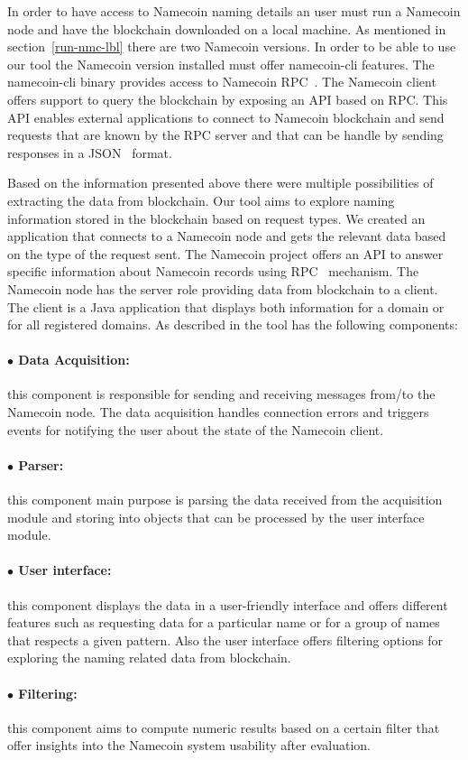 In order to have access to Namecoin naming details an user must run a Namecoin node and have the blockchain downloaded on a local machine.
As mentioned in section~\ref{run-nmc-lbl} there are two Namecoin versions. In order to be able to use our tool the Namecoin version installed must offer namecoin-cli features. The namecoin-cli binary provides access to Namecoin RPC~\cite{rfc1057}. The Namecoin client offers support to query the blockchain by exposing an API based on RPC. This API enables external applications to connect to Namecoin blockchain and send requests that are known by the RPC server and that can be handle by sending responses in a JSON~\cite{rfc7159} format.

Based on the information presented above there were multiple possibilities of extracting the data from blockchain.
Our tool aims to explore naming information stored in the blockchain based on request types.
We created an application that connects to a Namecoin node and gets the relevant data based on the type of the request sent. The Namecoin project offers an API to answer specific information about Namecoin records using RPC~\cite{rfc5531} mechanism.
The Namecoin node has the server role providing data from blockchain to a client. The client is a Java application that displays both information for a  domain or for all  registered domains. As described in  the tool has the following components:
\paragraph{$\bullet$ Data Acquisition:} this component is responsible for sending and receiving messages from/to the Namecoin node. The data acquisition handles connection errors and triggers events for notifying the user about the state of the Namecoin client.
\paragraph{$\bullet$ Parser:} this component main purpose is parsing the data received from the acquisition module and storing into objects that can be processed by the user interface module.
\paragraph{$\bullet$ User interface:} this component displays the data in a user-friendly interface and offers different features such as requesting data for a particular name or for a group of names that respects a given pattern. Also the user interface offers filtering options for exploring the naming related data from blockchain.
\paragraph{$\bullet$ Filtering:} this component aims to compute numeric results based on a certain filter that offer insights into the Namecoin system usability after evaluation.




